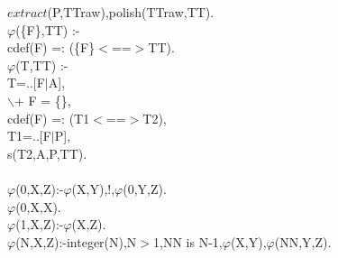 \documentclass[11pt]{report}
\begin{document}
\begin{sf}\begin{tabbing}
\hspace{2em}$extract$(P,TTraw),polish(TTraw,TT).\\[-0.15ex]
$\varphi$(\{F\},TT) :-\\[-0.15ex]
\hspace{2em}cdef(F) =: (\{F\}$<$==$>$TT).\\[-0.15ex]
$\varphi$(T,TT) :-\\[-0.15ex]
\hspace{2em}T=..[F$\mid$A],\\[-0.15ex]
\hspace{2em}$\backslash$+ F = \{\},\\[-0.15ex]
\hspace{2em}cdef(F) =: (T1$<$==$>$T2),\\[-0.15ex]
\hspace{2em}T1=..[F$\mid$P],\\[-0.15ex]
\hspace{2em}s(T2,A,P,TT).\\[-0.7ex]
\\[-0.15ex]
$\varphi$(0,X,Z):-$\varphi$(X,Y),!,$\varphi$(0,Y,Z).\\[-0.15ex]
$\varphi$(0,X,X).\\[-0.15ex]
$\varphi$(1,X,Z):-$\varphi$(X,Z).\\[-0.15ex]
$\varphi$(N,X,Z):-integer(N),N$>$1,NN is N-1,$\varphi$(X,Y),$\varphi$(NN,Y,Z).\\[-0.7ex]

\end{tabbing}\end{sf}

  
\end{document}
